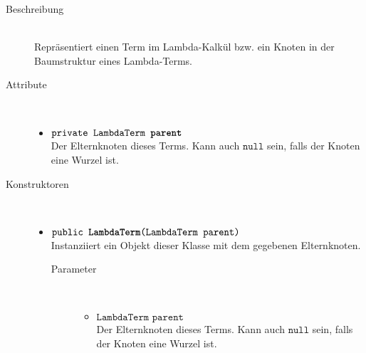 \begin{description}
\item[Beschreibung] \hfill \\ Repräsentiert einen Term im Lambda-Kalkül bzw. ein Knoten in der Baumstruktur eines Lambda-Terms.
\item[Attribute] \hfill \\
	\vspace{-.8cm}
	\begin{itemize}
		\item $\texttt{private LambdaTerm \textbf{parent}}$ \\ Der Elternknoten dieses Terms. Kann auch $\texttt{null}$ sein, falls der Knoten eine Wurzel ist.
	\end{itemize}
	
\item[Konstruktoren] \hfill \\
	\vspace{-.8cm}
	\begin{itemize}
		\item $\texttt{public \textbf{LambdaTerm}(LambdaTerm parent)}$ \\ Instanziiert ein Objekt dieser Klasse mit dem gegebenen Elternknoten.
		\begin{description}
			\item[Parameter] \hfill \\
			\vspace{-.8cm}
			\begin{itemize}
				\item $\texttt{LambdaTerm parent}$ \\ Der Elternknoten dieses Terms. Kann auch $\texttt{null}$ sein, falls der Knoten eine Wurzel ist.
			\end{itemize}
		\end{description}
	\end{itemize}
	

\end{description}
